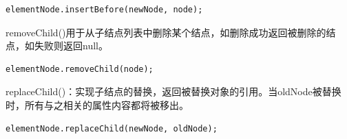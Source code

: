 \begin{lstlisting}[style=htmlcssjs]
elementNode.insertBefore(newNode, node);
\end{lstlisting}

removeChild()用于从子结点列表中删除某个结点，如删除成功返回被删除的结点，如失败则返回null。 \\

\begin{lstlisting}[style=htmlcssjs]
elementNode.removeChild(node);
\end{lstlisting}

replaceChild()：实现子结点的替换，返回被替换对象的引用。当oldNode被替换时，所有与之相关的属性内容都将被移出。 \\

\begin{lstlisting}[style=htmlcssjs]
elementNode.replaceChild(newNode, oldNode);
\end{lstlisting}